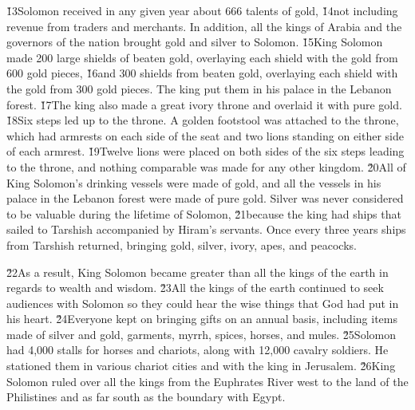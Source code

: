 \v{13}Solomon received in any given year about 666 talents of gold, \v{14}not including revenue from traders and merchants. In addition, all the kings of Arabia and the governors of the nation brought gold and silver to Solomon. \v{15}King Solomon made 200 large shields of beaten gold, overlaying each shield with the gold from 600 gold pieces, \v{16}and 300 shields from beaten gold, overlaying each shield with the gold from 300 gold pieces. The king put them in his palace in the Lebanon forest. \v{17}The king also made a great ivory throne and overlaid it with pure gold. \v{18}Six steps led up to the throne. A golden footstool was attached to the throne, which had armrests on each side of the seat and two lions standing on either side of each armrest. \v{19}Twelve lions were placed on both sides of the six steps leading to the throne, and nothing comparable was made for any other kingdom. \v{20}All of King Solomon's drinking vessels were made of gold, and all the vessels in his palace in the Lebanon forest were made of pure gold. Silver was never considered to be valuable during the lifetime of Solomon, \v{21}because the king had ships that sailed to Tarshish accompanied by Hiram's servants. Once every three years ships from Tarshish returned, bringing gold, silver, ivory, apes, and peacocks.

\v{22}As a result, King Solomon became greater than all the kings of the earth in regards to wealth and wisdom. \v{23}All the kings of the earth continued to seek audiences with Solomon so they could hear the wise things that God had put in his heart. \v{24}Everyone kept on bringing gifts on an annual basis, including items made of silver and gold, garments, myrrh, spices, horses, and mules. \v{25}Solomon had 4,000 stalls for horses and chariots, along with 12,000 cavalry soldiers. He stationed them in various chariot cities and with the king in Jerusalem. \v{26}King Solomon ruled over all the kings from the Euphrates River west to the land of the Philistines and as far south as the boundary with Egypt.

